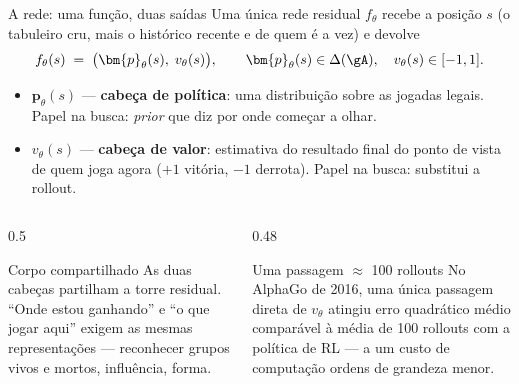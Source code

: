 \documentclass[aspectratio=169, 10pt]{beamer}
\newcommand{\redeval}{v_{\theta}}
\newcommand{\redepol}{\bm{p}_{\theta}}
\begin{document}
\begin{frame}{A rede: uma função, duas saídas}
  \small
  Uma única rede residual $f_{\theta}$ recebe a posição $s$ (o tabuleiro cru, mais
  o histórico recente e de quem é a vez) e devolve
  \[
    f_{\theta}(s) \;=\; \bigl(\redepol(s),\; \redeval(s)\bigr),
    \qquad
    \redepol(s) \in \Delta(\gA),\quad \redeval(s) \in [-1,1].
  \]
  \begin{itemize}
    \item $\redepol(s)$ — \textbf{cabeça de política}: uma distribuição sobre as
          jogadas legais. Papel na busca: \emph{prior} que diz por onde começar a
          olhar.
    \item $\redeval(s)$ — \textbf{cabeça de valor}: estimativa do resultado final
          do ponto de vista de quem joga agora ($+1$ vitória, $-1$ derrota).
          Papel na busca: substitui a rollout.
  \end{itemize}

  \begin{columns}[T]
    \begin{column}{0.5\textwidth}
      \begin{defbox}{Corpo compartilhado}
        As duas cabeças partilham a torre residual. ``Onde estou ganhando'' e
        ``o que jogar aqui'' exigem as mesmas representações — reconhecer grupos
        vivos e mortos, influência, forma.
      \end{defbox}
    \end{column}
    \begin{column}{0.48\textwidth}
      \begin{teobox}{Uma passagem $\approx$ 100 rollouts}
        No AlphaGo de 2016, uma única passagem direta de $\redeval$ atingiu erro
        quadrático médio comparável à média de 100 rollouts com a política de RL
        — a um custo de computação ordens de grandeza menor.
      \end{teobox}
    \end{column}
  \end{columns}
\end{frame}
\end{document}
